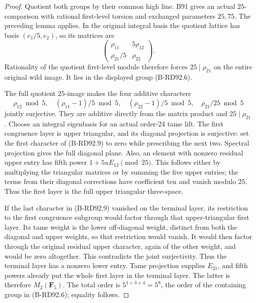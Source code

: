 \begin{proof}
Quotient both groups by their common high line. B91 gives an
actual \(25\)-comparison with rational first-level torsion and
exchanged parameters \(25,75\). The preceding lemma applies.
In the original integral basis the quotient lattice has basis
\((e_1/5,e_2)\), so its matrices are
\[
       \begin{pmatrix}\rho_{11}&5\rho_{12}\\
                   \rho_{21}/5&\rho_{22}\end{pmatrix}.
                                                        \tag{B-RD92.8}
\]
Rationality of the quotient first-level module therefore forces
\(25\mid\rho_{21}\) on the entire original wild image. It lies
in the displayed group (B-RD92.6).

The full quotient \(25\)-image makes the four additive characters
\[
 \rho_{12}\bmod5,\quad
 (\rho_{11}-1)/5\bmod5,\quad
 (\rho_{22}-1)/5\bmod5,\quad
 \rho_{21}/25\bmod5                                  \tag{B-RD92.9}
\]
jointly surjective. They are additive directly from the matrix
product and \(25\mid\rho_{21}\). Choose an integral eigenbasis
for an actual order-24 tame lift. The first congruence layer is
upper triangular, and its diagonal projection is surjective:
set the first character of (B-RD92.9) to zero while prescribing
the next two. Spectral projection gives the full diagonal plane.
Also, an element with nonzero residual upper entry has fifth power
\(1+5uE_{12}\pmod{25}\). This follows either by multiplying
the triangular matrices or by summing the five upper entries;
the terms from their diagonal corrections have coefficient ten
and vanish modulo 25. Thus the first layer is the full upper
triangular three-space.

If the last character in (B-RD92.9) vanished on the terminal layer,
its restriction to the first congruence subgroup would factor
through that upper-triangular first layer. Its tame weight is the
lower off-diagonal weight, distinct from both the diagonal and
upper weights, so that restriction would vanish. It would then
factor through the original residual upper character, again of
the other weight, and would be zero altogether. This contradicts
the joint surjectivity. Thus the terminal layer has a nonzero lower
entry. Tame projection supplies \(E_{21}\), and fifth powers
already put the whole first layer in the terminal layer. The latter
is therefore \(M_2(\mathbf F_5)\). The total order is
\(5^{1+3+4}=5^8\), the order of the containing group in
(B-RD92.6); equality follows.


\end{proof}
